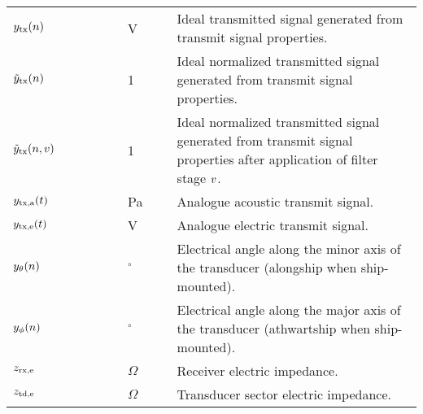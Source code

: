 \documentclass[12pt,a4paper]{article}
\begin{document}
\begin{longtable}{p{0.15\linewidth} p{0.13\linewidth} p{0.12\linewidth} p{0.6\linewidth} }
$y_{\textrm{tx}}(n)$ & & V & Ideal transmitted signal generated from transmit signal properties.\\
$\tilde{y}_{\textrm{tx}}(n)$ & & 1 & Ideal normalized transmitted signal generated from transmit signal properties.\\
$\tilde{y}_{\textrm{tx}}(n,v)$ & & 1 & Ideal normalized transmitted signal generated from transmit signal properties after application of filter stage $v$.\\

$y_{\textrm{tx,a}}(t)$ & & Pa & Analogue acoustic transmit signal.\\

$y_{\textrm{tx,e}}(t)$ & & V & Analogue electric transmit signal.\\

$y_\theta(n)$ & & $^{\circ}$ & Electrical angle along the minor axis of the transducer (alongship when ship-mounted).\\
$y_\phi(n)$ & & $^{\circ}$ & Electrical angle along the major axis of the transducer (athwartship when ship-mounted).\\

$z_{\textrm{rx,e}}$ & & $\Omega$ & Receiver electric impedance.\\
$z_{\textrm{td,e}}$ & & $\Omega$ & Transducer sector electric impedance.\\


\end{longtable}
\end{document}
